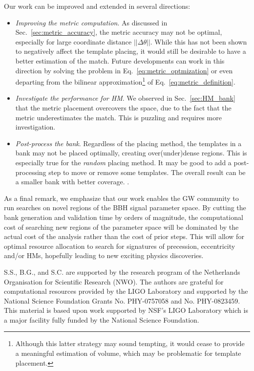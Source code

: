 \documentclass[twocolumn,showpacs,preprintnumbers,nofootinbib,prd,
superscriptaddress,10pt]{revtex4-2}
\begin{document}
Our work can be improved and extended in several directions:
\begin{itemize}
	\item {\it Improving the metric computation}. As discussed in Sec.~\ref{sec:metric_accuracy}, the metric accuracy may not be optimal, especially for large coordinate distance $||\Delta\theta||$. While this has not been shown to negatively affect the template placing, it would still be desirable to have a better estimation of the match. Future developments can work in this direction by solving the problem in Eq.~\eqref{eq:metric_optmization} or even departing from the bilinear approximation\footnote{
Although this latter strategy may sound tempting, it would cease to provide a meaningful estimation of volume, which may be problematic for template placement.} of Eq.~\eqref{eq:metric_definition}.
	
	\item {\it Investigate the performance for HM}. We observed in Sec.~\ref{sec:HM_bank} that the metric placement overcovers the space, due to the fact that the metric underestimates the match. This is puzzling and requires more investigation.
	
	\item {\it Post-process the bank}. Regardless of the placing method, the templates in a bank may not be placed optimally, creating over(under)dense regions. This is especially true for the {\it random} placing method. It may be good to add a post-processing step to move or remove some templates. The overall result can be a smaller bank with better coverage. \cite{Indik:2017vqq}.
\end{itemize}

As a final remark, we emphasize that our work enables the GW community to run searches on novel regions of the BBH signal parameter space. By cutting the bank generation and validation time by orders of magnitude, the computational cost of searching new regions of the parameter space will be dominated by the actual cost of the analysis rather than the cost of prior steps.
This will allow for optimal resource allocation to search for signatures of precession, eccentricity and/or HMs, hopefully leading to new exciting physics discoveries.

        \begin{acknowledgments}
		S.S., B.G., and S.C. are supported by the research program of the Netherlands Organisation for Scientific Research (NWO).
		The authors are grateful for computational resources provided by the LIGO Laboratory and supported by the National Science Foundation Grants No. PHY-0757058 and No. PHY-0823459. This material is based upon work supported by NSF’s LIGO Laboratory which is a major facility fully funded by the National Science Foundation.
        \end{acknowledgments}
\end{document}
